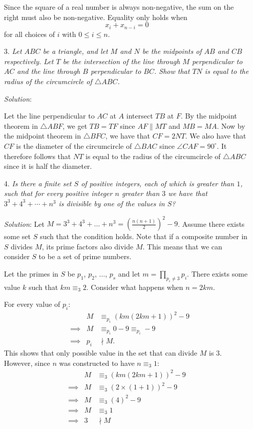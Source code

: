 \documentclass{article}
\begin{document}
\begin{enumerate}
Since the square of a real number is always non-negative, the sum on the right must also be non-negative.
Equality only holds when
$$x_i + x_{n-i} = 0$$
for all choices of $i$ with $0 \le i \le n$.


\item[3.] %
\textit{Let $ABC$ be a triangle, and let $M$ and $N$ be the midpoints of $AB$ and $CB$ respectively.
Let $T$ be the intersection of the line through $M$ perpendicular to $AC$ and the line through $B$ perpendicular to $BC$.
Show that $TN$ is equal to the radius of the circumcircle of $\triangle ABC$.}

\textit{Solution}:

Let the line perpendicular to $AC$ at $A$ intersect $TB$ at $F$.
By the midpoint theorem in $\triangle ABF$, we get $TB=TF$ since $AF\parallel MT$ and $MB=MA$.
Now by the midpoint theorem in $\triangle BFC$, we have that $CF=2NT$.
We also have that $CF$ is the diameter of the circumcircle of $\triangle BAC$ since $\angle CAF=90^\circ$.
It therefore follows that $NT$ is equal to the radius of the circumcircle of $\triangle ABC$ since it is half the diameter.


\item[4.] %
\textit{Is there a finite set $S$ of positive integers, each of which is greater than $1$, such that for every positive integer $n$ greater than $3$ we have that $3^3 +4^3 +\dotsb +n^3$ is divisible by one of the values in $S$?}

\textit{Solution}:
Let $M = 3^3 + 4^3 + \dots + n^3 = \left(\frac{n(n + 1)}{2}\right)^2 - 9$.
Assume there exists some set $S$ such that the condition holds.
Note that if a composite number in $S$ divides $M$, its prime factors also divide $M$.
This means that we can consider $S$ to be a set of prime numbers.

Let the primes in $S$ be $p_1$, $p_2$, $\dots$, $p_s$ and let $m = \prod_{p_i \neq 3}p_i$.
There exists some value $k$ such that $km \equiv _3 2$.
Consider what happens when $n = 2km$.

For every value of $p_i$:
\begin{align*}
  & & M &\equiv _{p_i} (km(2km + 1))^2 - 9 \\
  & \implies & M &\equiv _{p_i} 0 - 9 \equiv_{p_i} -9 \\
  & \implies & p_i &\nmid M.
\end{align*}
This shows that only possible value in the set that can divide $M$ is $3$.
However, since $n$ was constructed to have $n \equiv _3 1$:
\begin{align*}
  &&M &\equiv _3 (km(2km + 1))^2 - 9 \\
  &\implies& M &\equiv _3 (2 \times (1 + 1))^2 - 9 \\
  &\implies& M &\equiv _3 (4)^2 - 9 \\
  &\implies& M &\equiv _3 1 \\
  &\implies& 3 &\nmid M &
\end{align*}


\end{enumerate}
\end{document}

